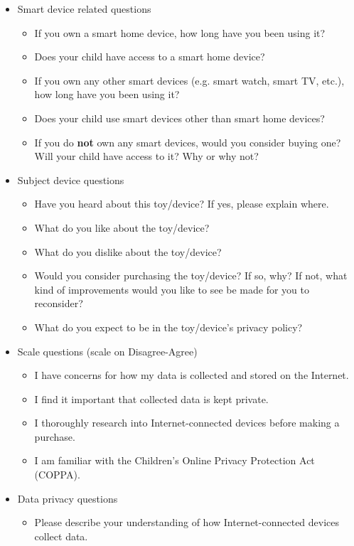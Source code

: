 \documentclass[12pt]{ucthesis}
\begin{document}
\begin{itemize}
    \item Smart device related questions
    \begin{itemize}
        \item If you own a smart home device, how long have you been using it?
        \item Does your child have access to a smart home device?
        \item If you own any other smart devices (e.g. smart watch, smart TV, etc.), how long have you been using it?
        \item Does your child use smart devices other than smart home devices?
        \item If you do \textbf{not} own any smart devices, would you consider buying one? Will your child have access to it? Why or why not?
    \end{itemize}
    \item Subject device questions
    \begin{itemize}
        \item Have you heard about this toy/device? If yes, please explain where.
        \item What do you like about the toy/device?
        \item What do you dislike about the toy/device?
        \item Would you consider purchasing the toy/device? If so, why? If not, what kind of improvements would you like to see be made for you to reconsider?
        \item What do you expect to be in the toy/device's privacy policy?
    \end{itemize}
    \item Scale questions (scale on Disagree-Agree)
    \begin{itemize}
        \item I have concerns for how my data is collected and stored on the Internet.
        \item I find it important that collected data is kept private.
        \item I thoroughly research into Internet-connected devices before making a purchase.
        \item I am familiar with the Children’s Online Privacy Protection Act (COPPA).
    \end{itemize}
    \item Data privacy questions
    \begin{itemize}
        \item Please describe your understanding of how Internet-connected devices collect data. 

\end{itemize}
\end{itemize}
\end{document}
